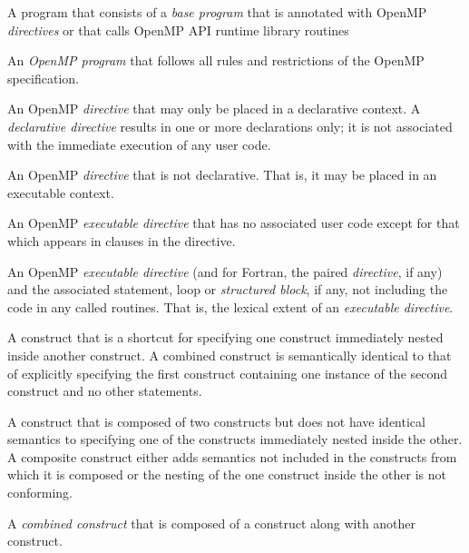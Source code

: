 \glossarydefstart
A program that consists of a \emph{base program} that is annotated with OpenMP
\emph{directives} or that calls OpenMP API runtime library routines
\glossarydefend

\glossarydefstart
An \emph{OpenMP program} that follows all rules and restrictions of the OpenMP
specification.
\glossarydefend

\glossarydefstart
An OpenMP \emph{directive} that may only be placed in a declarative context. A
\emph{declarative directive} results in one or more declarations only; it is 
not associated with the immediate execution of any user code.
\glossarydefend

\glossarydefstart
An OpenMP \emph{directive} that is not declarative. That is, it may be 
placed in an executable context.
\glossarydefend

\glossarydefstart
An OpenMP \emph{executable directive} that has no associated user
code except for that which appears in clauses in the directive.
\glossarydefend


\glossarydefstart
An OpenMP \emph{executable directive} (and for Fortran, the paired 
 \emph{directive}, if any) and the associated statement, 
loop or \emph{structured block}, if any, not including the code in 
any called routines. That is, the lexical extent of an \emph{executable
directive}.
\glossarydefend

\glossarydefstart
A construct that is a shortcut for specifying one construct immediately 
nested inside another construct. A combined construct is semantically 
identical to that of explicitly specifying the first construct containing 
one instance of the second construct and no other statements.
\glossarydefend

\glossarydefstart
A construct that is composed of two constructs but does not have identical 
semantics to specifying one of the constructs immediately nested inside the 
other. A composite construct either adds semantics not included in the 
constructs from which it is composed or the nesting of the one construct 
inside the other is not conforming.
\glossarydefend

\glossarydefstart
A \emph{combined construct} that is composed of a  construct 
along with another construct.
\glossarydefend


